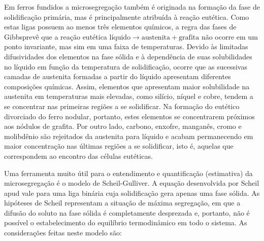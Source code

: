 Em ferros fundidos a microsegregação também é originada na formação da fase de solidificação primária, mas é principalmente atribuída à reação eutética. Como estas ligas possuem ao menos três elementos químicos, a regra das fases de Gibbs\footnotemark prevê que a reação eutética $\text{líquido} \rightarrow \text{austenita} + \text{grafita}$ não ocorre em um ponto invariante, mas sim em uma faixa de temperaturas. Devido às limitadas difusividades dos elementos na fase sólida e à dependência de suas solubilidades no líquido em função da temperatura de solidificação, ocorre que as sucessivas camadas de austenita formadas a partir do líquido apresentam diferentes composições químicas. Assim, elementos que apresentam maior solubilidade na austenita em temperaturas mais elevadas, como silício, níquel e cobre, tendem a se concentrar nas primeiras regiões a se solidificar. Na formação do eutético divorciado do ferro nodular, portanto, estes elementos se concentrarem próximos aos nódulos de grafita. Por outro lado, carbono, enxofre, manganês, cromo e molibdênio são rejeitados da austenita para líquido e acabam permanecendo em maior concentração nas últimas regiões a se solidificar, isto é, aquelas que correspondem ao encontro das células eutéticas. %


Uma ferramenta muito útil para o entendimento e quantificação (estimativa) da microsegregação é o modelo de Scheil-Gulliver. %
A equação desenvolvida por Scheil apud  %
vale para uma liga binária cuja solidificação gera apenas uma fase sólida. As hipóteses de Scheil representam a situação de máxima segregação, em que a difusão do soluto na fase sólida é completamente desprezada e, portanto, não é possível o estabelecimento do equilíbrio termodinâmico em todo o sistema. As considerações feitas neste modelo são\cite{Porter2009}:

